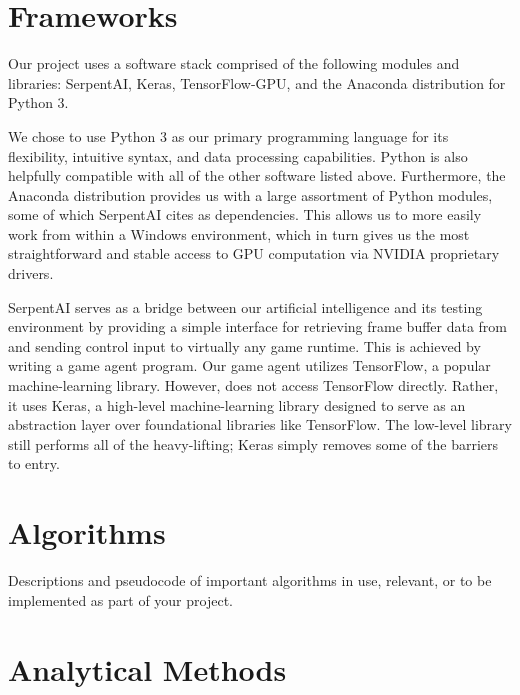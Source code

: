 


\section{Frameworks}

Our project uses a software stack comprised of the following modules and libraries: SerpentAI, Keras, TensorFlow-GPU, and the Anaconda distribution for Python 3.

We chose to use Python 3 as our primary programming language for its flexibility, intuitive syntax, and data processing capabilities. Python is also helpfully compatible with all of the other software listed above. Furthermore, the Anaconda distribution provides us with a large assortment of Python modules, some of which SerpentAI cites as dependencies. This allows us to more easily work from within a Windows environment, which in turn gives us the most straightforward and stable access to GPU computation via NVIDIA proprietary drivers.

SerpentAI serves as a bridge between our artificial intelligence and its testing environment by providing a simple interface for retrieving frame buffer data from and sending control input to virtually any game runtime. This is achieved by writing a game agent program. Our game agent utilizes TensorFlow, a popular machine-learning library. However, does not access TensorFlow directly. Rather, it uses Keras, a high-level machine-learning library designed to serve as an abstraction layer over foundational libraries like TensorFlow. The low-level library still performs all of the heavy-lifting; Keras simply removes some of the barriers to entry.




\section{Algorithms}

Descriptions and pseudocode of important algorithms in use, relevant, or to be implemented as part of your project.




\section{Analytical Methods}

